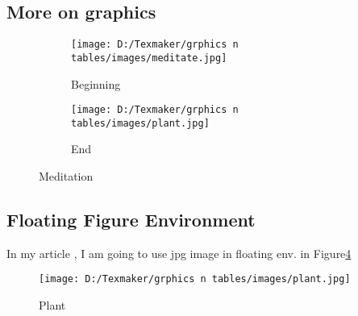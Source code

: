 \documentclass{article}
\begin{document}
\subsection{More on graphics}

\begin{figure}
\begin {center}

\begin{subfigure}[b]{0.2\textwidth}
\centering
\texttt{[image: D:/Texmaker/grphics n tables/images/meditate.jpg]}
\caption{Beginning}
\label{fig:meditate1}
\end{subfigure}

\begin{subfigure}[b]{0.2\textwidth}
\centering
\texttt{[image: D:/Texmaker/grphics n tables/images/plant.jpg]}
\caption{End}
\label{fig:plant1}
\end{subfigure}

\caption{Meditation}
\label{fig:subs}
\end {center}
\end{figure}






\subsection{Floating Figure Environment}
In my article , I am going to use jpg image in floating env. in Figure\ref{fig:plant}

\begin{figure}
\begin{center}
\texttt{[image: D:/Texmaker/grphics n tables/images/plant.jpg]}
\caption{Plant}
\label{fig:plant}
\end{center}
\end{figure}
\end{document}
